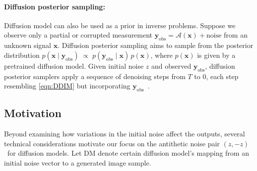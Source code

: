 \documentclass[12pt]{article}
\newcommand{\0}{\mathbf{0}}
\newcommand{\DM}{\text{DM}}
\begin{document}
\paragraph{Diffusion posterior sampling:}
Diffusion model can also be used as a prior  in inverse problems.
Suppose we observe only a partial or corrupted measurement
$\mathbf{y}_\text{obs} = \mathcal{A}(\mathbf{x}) + \text{noise}$
from an unknown signal $\mathbf{x}$. Diffusion posterior sampling aims to sample from the  posterior distribution
$p(\mathbf{x}\mid \mathbf{y}_\text{obs}) \;\propto\; p(\mathbf{y}_\text{obs}\mid \mathbf{x})\,p(\mathbf{x})
$, where $p(\mathbf{x})$ is given by a pretrained diffusion model. Given initial noise $z$ and observed $\mathbf{y}_\text{obs}$, diffusion posterior samplers apply a sequence of denoising steps from $T$ to $0$, each step resembling \eqref{eqn:DDIM} but incorporating $\mathbf{y}_\text{obs}$~\citep{chung2023diffusion, song2022solving, song2024solving}.

\subsection{Motivation}\label{subsec:motivation}

Beyond examining how variations in the initial noise affect the outputs, several technical considerations motivate our focus on the antithetic noise pair $(z,-z)$\ for diffusion models. Let $\DM$ denote certain diffusion model’s mapping from an initial noise vector to a generated image sample. 
\end{document}
